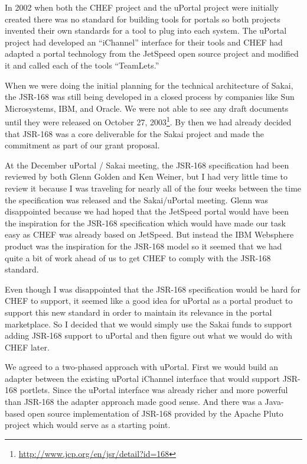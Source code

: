 \documentclass[12pt]{book}
\begin{document}
In 2002 when both the CHEF project and the uPortal project
were initially created there was no standard for building tools for portals
so both projects invented their own standards for a tool to plug into each system.
The uPortal project had developed an ``iChannel'' interface for their tools
and CHEF had adapted a portal technology from the JetSpeed open source project
and modified it and called each of the tools ``TeamLets.''

When we were doing the initial planning for the technical architecture
of Sakai, the JSR-168 was still being developed in a closed
process by companies like Sun Microsystems, IBM, and Oracle.
We were not able to see any draft documents
until they were released on October 27, 2003\footnote{\url{http://www.jcp.org/en/jsr/detail?id=168}}.
By then we had already decided that JSR-168 was a core deliverable
for the Sakai project and made the commitment as part of our grant proposal.

At the December uPortal / Sakai meeting, the JSR-168 specification had been
reviewed by both Glenn Golden
and Ken Weiner,
but I had very little time to review it
because I was traveling for nearly all of the four weeks between the
time the specification was released and the Sakai\slash uPortal meeting.
Glenn was disappointed because we had hoped that the JetSpeed portal would
have been the inspiration for the JSR-168 specification which would have made
our task easy as CHEF was already based on JetSpeed.  But instead the
IBM Websphere product was the inspiration for the JSR-168 model so it seemed
that we had quite a bit of work ahead of us to get CHEF to comply with the
JSR-168 standard.

Even though I was disappointed that the JSR-168 specification would be hard
for CHEF to support, it seemed like a good idea for uPortal as a portal
product to support this new standard in order to maintain its relevance in
the portal marketplace.  So I decided that we would simply use the Sakai funds
to support adding JSR-168 support to uPortal and then figure out what we would
do with CHEF later.

We agreed to a two-phased approach with uPortal.  First we would build an adapter
between the existing uPortal iChannel interface that would support
JSR-168 portlets.  Since the uPortal interface was already richer and more powerful
than JSR-168 the adapter approach made good sense.  And there was a Java-based
open source implementation of JSR-168 provided by the Apache Pluto project which
would serve as a starting point.
\end{document}
